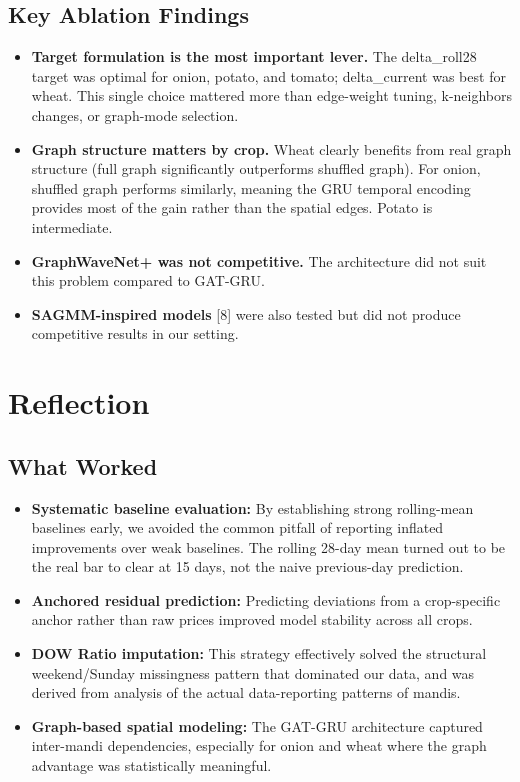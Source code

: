 \documentclass[12pt]{article}
\begin{document}
\subsection{Key Ablation Findings}

\begin{itemize}
\item \textbf{Target formulation is the most important lever.} The delta\_roll28 target was optimal for onion, potato, and tomato; delta\_current was best for wheat. This single choice mattered more than edge-weight tuning, k-neighbors changes, or graph-mode selection.
\item \textbf{Graph structure matters by crop.} Wheat clearly benefits from real graph structure (full graph significantly outperforms shuffled graph). For onion, shuffled graph performs similarly, meaning the GRU temporal encoding provides most of the gain rather than the spatial edges. Potato is intermediate.
\item \textbf{GraphWaveNet+ was not competitive.} The architecture did not suit this problem compared to GAT-GRU.
\item \textbf{SAGMM-inspired models} [8] were also tested but did not produce competitive results in our setting.
\end{itemize}

\section{Reflection}

\subsection{What Worked}

\begin{itemize}
\item \textbf{Systematic baseline evaluation:} By establishing strong rolling-mean baselines early, we avoided the common pitfall of reporting inflated improvements over weak baselines. The rolling 28-day mean turned out to be the real bar to clear at 15 days, not the naive previous-day prediction.
\item \textbf{Anchored residual prediction:} Predicting deviations from a crop-specific anchor rather than raw prices improved model stability across all crops.
\item \textbf{DOW Ratio imputation:} This strategy effectively solved the structural weekend/Sunday missingness pattern that dominated our data, and was derived from analysis of the actual data-reporting patterns of mandis.
\item \textbf{Graph-based spatial modeling:} The GAT-GRU architecture captured inter-mandi dependencies, especially for onion and wheat where the graph advantage was statistically meaningful.
\end{itemize}
\end{document}
